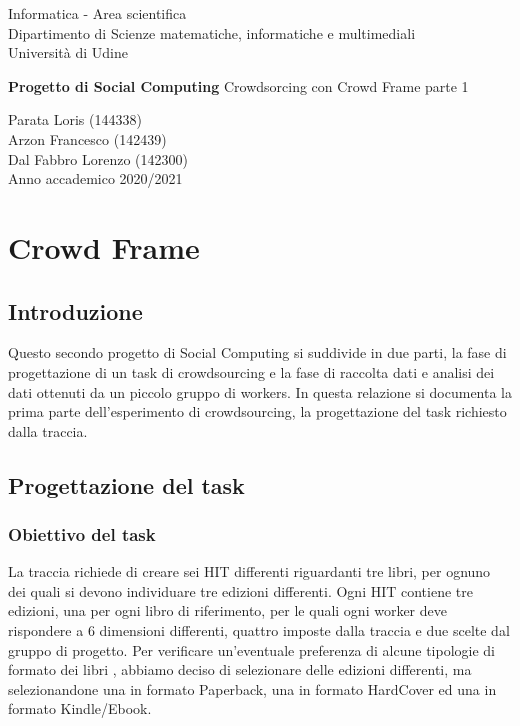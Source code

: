 \documentclass[a4paper,11pt]{report}
\begin{document}
\begin{titlepage}
  \clearpage\thispagestyle{empty}
  \centering
  \vspace{1cm}
  {\normalsize Informatica - Area scientifica \\  Dipartimento di Scienze matematiche, informatiche e multimediali\\  Università di Udine \par}
  \vspace{3cm}
  {\Huge \textbf{Progetto di Social Computing \newline
  } \LARGE{Crowdsorcing con Crowd Frame  parte 1}
  }

  \vspace{4cm}
  {\Large  Parata Loris (144338) \\ Arzon Francesco (142439)\\ Dal Fabbro Lorenzo (142300)\\ }
  \vspace{12cm}
  {\normalsize Anno accademico 2020/2021}
  \pagebreak
\end{titlepage}

\tableofcontents{}
\pagebreak
\chapter{Crowd Frame}
\section{Introduzione}
Questo secondo progetto di Social Computing si suddivide in due parti, la fase di progettazione di un task di crowdsourcing e la fase di raccolta dati e analisi dei dati ottenuti da un piccolo gruppo di workers.
In questa relazione si documenta  la prima parte dell'esperimento di crowdsourcing, la progettazione del task richiesto dalla traccia.


\section{Progettazione del task}

\subsection{Obiettivo del task}
La traccia richiede di creare sei HIT differenti riguardanti tre libri, per ognuno dei quali si devono individuare tre edizioni differenti. Ogni HIT contiene tre edizioni, una per ogni libro di riferimento, per le quali ogni worker deve rispondere a 6 dimensioni differenti, quattro imposte dalla traccia e due scelte dal gruppo di progetto.
Per verificare un'eventuale preferenza di alcune tipologie di formato dei libri , abbiamo deciso di selezionare delle edizioni differenti, ma selezionandone una in formato Paperback, una in formato HardCover ed una in formato Kindle/Ebook.
\end{document}
